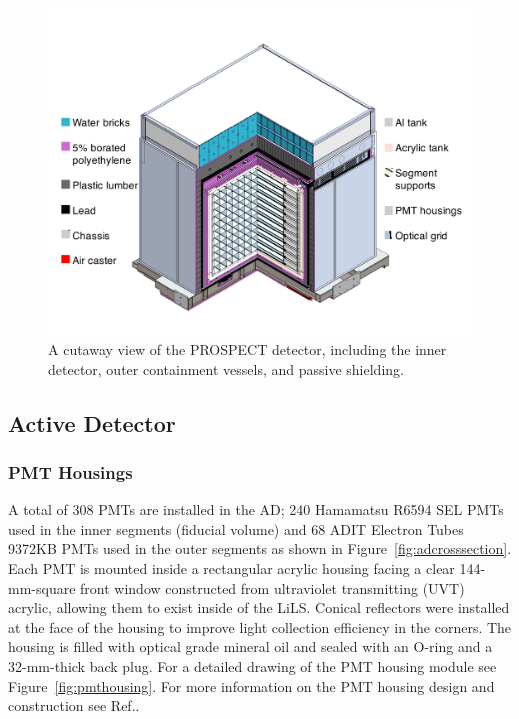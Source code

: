 \begin{figure}[t]
	\centering
	\includegraphics[width=0.8\linewidth]{tex/4-prospect-images/AD}
	\caption[Schematic of the PROSPECT detector]{A cutaway view of the PROSPECT detector, including the inner detector, outer containment vessels, and passive shielding.}
	\label{fig:ad}
\end{figure}

\subsection{Active Detector} \label{sec:InnerDetector}

\subsubsection{PMT Housings}

A total of 308 PMTs are installed in the AD; 240 Hamamatsu R6594 SEL PMTs used in the inner segments (fiducial volume) and 68 ADIT Electron Tubes 9372KB PMTs used in the outer segments as shown in Figure~\ref{fig:adcrosssection}.
Each PMT is mounted inside a rectangular acrylic housing facing a clear 144-mm-square front window constructed from ultraviolet transmitting (UVT) acrylic, allowing them to exist inside of the LiLS. 
Conical reflectors were installed at the face of the housing to improve light collection efficiency in the corners. 
The housing is filled with optical grade mineral oil and sealed with an O-ring and a 32-mm-thick back plug. 
For a detailed drawing of the PMT housing module see Figure~\ref{fig:pmthousing}.
For more information on the PMT housing design and construction see Ref.\cite{LongNIM}.

